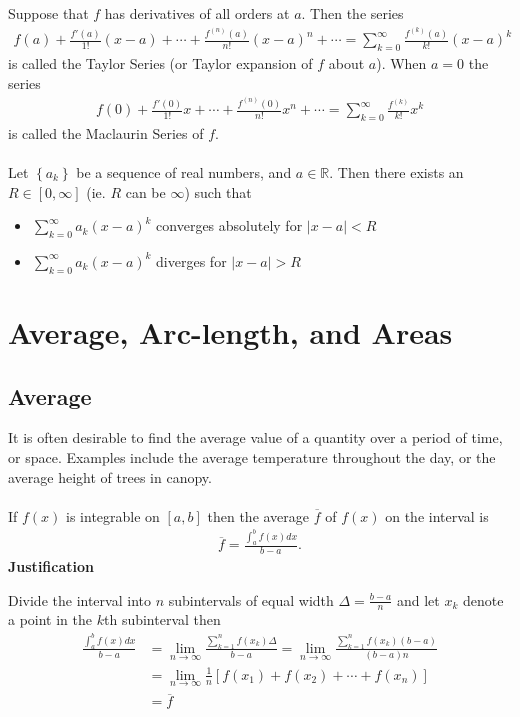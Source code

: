 \documentclass{report}
\begin{document}
			Suppose that $f$ has derivatives of all orders at $a$. Then the series
			\begin{align*}
			f(a) + \frac{f'(a)}{1!}(x-a) + \cdots + \frac{f^{(n)}(a)}{n!}(x-a)^n + \cdots = \sum_{k=0}^\infty \frac{f^{(k)}(a)}{k!} (x-a)^k
			\end{align*}
			is called the Taylor Series (or Taylor expansion of $f$ about $a$). When $a = 0$ the series
			\begin{align*}
				f(0) + \frac{f'(0)}{1!}x + \cdots + \frac{f^{(n)}(0)}{n!}x^n + \cdots = \sum_{k=0}^\infty \frac{f^{(k)}}{k!}x^k
			\end{align*}
			is called the Maclaurin Series of $f$.
			\\ \\
			Let $\left\{a_k\right\}$ be a sequence of real numbers, and $a \in \mathbb{R}$. Then there exists an $R \in [0, \infty]$ (ie. $R$ can be $\infty$) such that
			\begin{itemize}
				\item $\displaystyle\sum_{k=0}^\infty a_k(x - a)^k$ converges absolutely for $|x - a| < R$
				\item $\displaystyle\sum_{k=0}^\infty a_k(x - a)^k$ diverges for $|x - a| > R$
			\end{itemize}

\chapter{Average, Arc-length, and Areas}

	\section{Average}
		
		It is often desirable to find the average value of a quantity over a period of time, or space. Examples include the average temperature throughout the day, or the average height of trees in canopy.
		\\ \\
		If $f(x)$ is integrable on $[a,b]$ then the average $\overline{f}$ of $f(x)$ on the interval is
		\begin{align*}
			\overline{f} = \frac{\int_a^b f(x)dx}{b - a}.
		\end{align*}
		\textbf{Justification}

		Divide the interval into $n$ subintervals of equal width $\Delta = \frac{b-a}{n}$ and let $x_k$ denote a point in the $k$th subinterval then
		\begin{align*}
			\frac{\int_a^b f(x)dx}{b - a} &= \lim_{n\to \infty} \frac{\sum_{k=1}^n f(x_k) \Delta}{b-a} = \lim_{n\to \infty} \frac{\sum_{k=1}^n f(x_k) (b-a)}{(b-a)n}	\\
										  &= \lim_{n\to \infty} \frac{1}{n} [f(x_1) + f(x_2) + \cdots + f(x_n)]	\\
										  &= \overline{f}
		\end{align*}
		
\end{document}
